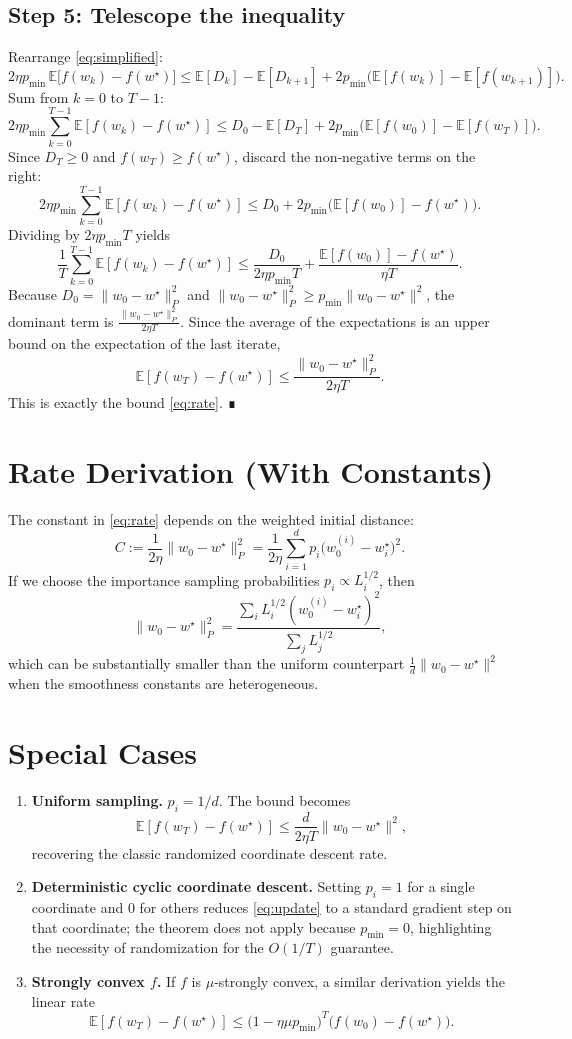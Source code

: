 \documentclass[11pt]{article}
\begin{document}
\subsection*{Step 5: Telescope the inequality}
Rearrange \eqref{eq:simplified}:
\[
2\eta p_{\min}\,\mathbb{E}\big[f(w_k)-f(w^{\star})\big]
\le \mathbb{E}[D_k]-\mathbb{E}[D_{k+1}]
      +2p_{\min}\big(\mathbb{E}[f(w_k)]-\mathbb{E}[f(w_{k+1})]\big).
\]
Sum from $k=0$ to $T-1$:
\[
2\eta p_{\min}\sum_{k=0}^{T-1}\mathbb{E}[f(w_k)-f(w^{\star})]
\le D_0 - \mathbb{E}[D_T]
      +2p_{\min}\big(\mathbb{E}[f(w_0)]-\mathbb{E}[f(w_T)]\big).
\]
Since $D_T\ge0$ and $f(w_T)\ge f(w^{\star})$, discard the non‑negative terms on the right:
\[
2\eta p_{\min}\sum_{k=0}^{T-1}\mathbb{E}[f(w_k)-f(w^{\star})]
\le D_0 +2p_{\min}\big(\mathbb{E}[f(w_0)]-f(w^{\star})\big).
\]
Dividing by $2\eta p_{\min}T$ yields
\[
\frac{1}{T}\sum_{k=0}^{T-1}\mathbb{E}[f(w_k)-f(w^{\star})]
\le \frac{D_0}{2\eta p_{\min}T}
      +\frac{\mathbb{E}[f(w_0)]-f(w^{\star})}{\eta T}.
\]
Because $D_0=\|w_0-w^{\star}\|_{P}^{2}$ and $\|w_0-w^{\star}\|_{P}^{2}\ge p_{\min}\|w_0-w^{\star}\|^{2}$, the dominant term is $\frac{\|w_0-w^{\star}\|_{P}^{2}}{2\eta T}$.  
Since the average of the expectations is an upper bound on the expectation of the last iterate,
\[
\mathbb{E}[f(w_T)-f(w^{\star})]\le \frac{\|w_0-w^{\star}\|_{P}^{2}}{2\eta T}.
\]
This is exactly the bound \eqref{eq:rate}. ∎
\bigskip

\section*{Rate Derivation (With Constants)}
The constant in \eqref{eq:rate} depends on the weighted initial distance:
\[
C:=\frac{1}{2\eta}\|w_0-w^{\star}\|_{P}^{2}
   =\frac{1}{2\eta}\sum_{i=1}^{d}p_i\big(w_{0}^{(i)}-w^{\star}_i\big)^{2}.
\]
If we choose the importance sampling probabilities $p_i\propto L_i^{1/2}$, then
\[
\|w_0-w^{\star}\|_{P}^{2}
   =\frac{\sum_i L_i^{1/2}(w_{0}^{(i)}-w^{\star}_i)^{2}}
          {\sum_j L_j^{1/2}},
\]
which can be substantially smaller than the uniform counterpart $\frac1d\|w_0-w^{\star}\|^{2}$ when the smoothness constants are heterogeneous.

\section*{Special Cases}
\begin{enumerate}
\item \textbf{Uniform sampling.} $p_i=1/d$. The bound becomes
\[
\mathbb{E}[f(w_T)-f(w^{\star})]\le \frac{d}{2\eta T}\|w_0-w^{\star}\|^{2},
\]
recovering the classic randomized coordinate descent rate.
\item \textbf{Deterministic cyclic coordinate descent.} Setting $p_i=1$ for a single coordinate and $0$ for others reduces \eqref{eq:update} to a standard gradient step on that coordinate; the theorem does not apply because $p_{\min}=0$, highlighting the necessity of randomization for the $O(1/T)$ guarantee.
\item \textbf{Strongly convex $f$.} If $f$ is $\mu$‑strongly convex, a similar derivation yields the linear rate
\[
\mathbb{E}[f(w_T)-f(w^{\star})]\le
\big(1-\eta\mu p_{\min}\big)^{T}\big(f(w_0)-f(w^{\star})\big).
\]
\end{enumerate}
\end{document}
